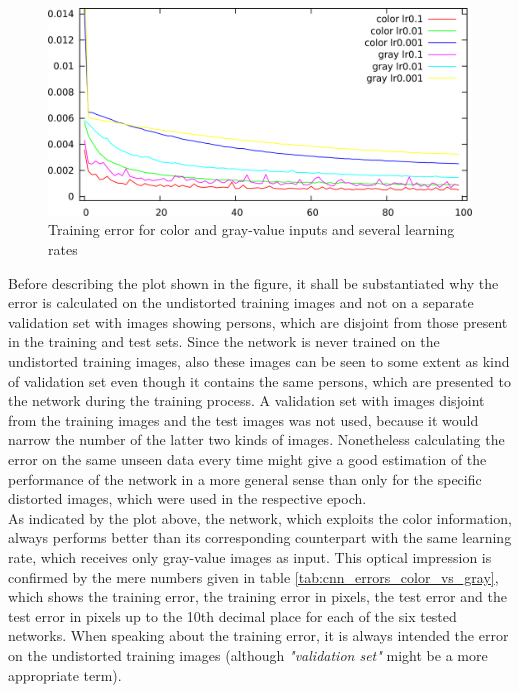 \documentclass[11pt, a4paper]{article}
\newcommand\q[1]{\emph{"#1"}}
\begin{document}
\begin{figure}[htbp]
	\centering
	\includegraphics[width=\textwidth]{results/cnn_color_vs_gray.png}
	\caption{Training error for color and gray-value inputs and several learning rates}
	\label{fig:cnn_color_vs_gray}
\end{figure}

Before describing the plot shown in the figure, it shall be substantiated why the error is calculated on the undistorted training images and not on a separate validation set with images showing persons, which are disjoint from those present in the training and test sets. Since the network is never trained on the undistorted training images, also these images can be seen to some extent as kind of validation set even though it contains the same persons, which are presented to the network during the training process. A validation set with images disjoint from the training images and the test images was not used, because it would narrow the number of the latter two kinds of images. Nonetheless calculating the error on the same unseen data every time might give a good estimation of the performance of the network in a more general sense than only for the specific distorted images, which were used in the respective epoch.\\
As indicated by the plot above, the network, which exploits the color information, always performs better than its corresponding counterpart with the same learning rate, which receives only gray-value images as input. This optical impression is confirmed by the mere numbers given in table \ref{tab:cnn_errors_color_vs_gray}, which shows the training error, the training error in pixels, the test error and the test error in pixels up to the 10th decimal place for each of the six tested networks. When speaking about the training error, it is always intended the error on the undistorted training images (although \q{validation set} might be a more appropriate term).
\end{document}
